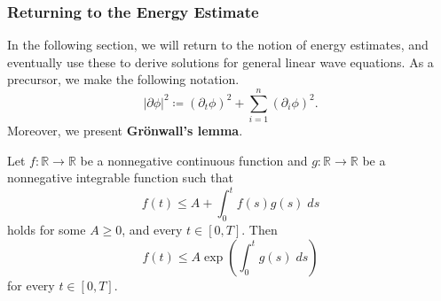 \documentclass{article}
\numberwithin{equation}{section}
\begin{document}
	\subsubsection{Returning to the Energy Estimate}
	In the following section, we will return to the notion of energy estimates, and eventually use these to derive solutions for general linear wave equations. As a precursor, we make the following notation.
	\begin{equation}
		|\partial \phi|^{2} \coloneqq  (\partial_{t}\phi)^{2} + \sum_{i = 1}^{n}(\partial_{i}\phi)^{2}. 
	\end{equation}
	Moreover, we present \textbf{Gr\"onwall's lemma}. 
	\begin{lemma}
		Let $f: \mathbb{R} \to \mathbb{R}$ be a nonnegative continuous function and $g: \mathbb{R} \to \mathbb{R}$ be a nonnegative integrable function such that 
		\begin{equation*}
			f(t) \leq A + \int_{0}^{t}f(s)g(s)\;ds
		\end{equation*}
		holds for some $A \geq 0$, and every $t \in [0,T]$. Then 
		\begin{equation*}
			f(t) \leq A \exp\left(\int_{0}^{t}g(s)\;ds\right)
		\end{equation*}
		for every $t \in [0,T]$. 
	\end{lemma}
\end{document}
